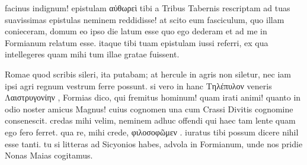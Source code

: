 


 facinus indignum! epistulam αὐθωρεὶ tibi a Tribus Tabernis rescriptam ad tuas suavissimas epistulas neminem reddidisse! at scito eum fasciculum, quo illam conieceram, domum eo ipso die latum esse quo ego dederam et ad me in Formianum relatum esse. itaque tibi tuam epistulam iussi referri, ex qua intellegeres quam mihi tum illae gratae fuissent.

 Romae quod scribis sileri, ita putabam; at hercule in agris non siletur, nec iam ipsi agri regnum vestrum ferre possunt. si vero in hanc Τηλέπυλον veneris Λαιστρυγονίην , Formias dico, qui fremitus hominum! quam irati animi! quanto in odio noster amicus Magnus! cuius cognomen una cum Crassi Divitis cognomine consenescit. credas mihi velim, neminem adhuc offendi qui haec tam lente quam ego fero ferret. qua re, mihi crede, φιλοσοφῶμεν . iuratus tibi possum dicere nihil esse tanti. tu si litteras ad Sicyonios habes, advola in Formianum, unde nos pridie Nonas Maias cogitamus.
